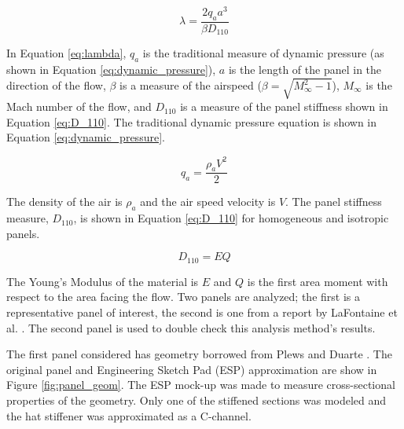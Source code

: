 \documentclass[a4paper, 12pt]{article}
\begin{document}
\begin{equation}
\lambda = \frac{2 q_a a^3}{\beta D_{110}}
\label{eq:lambda}
\end{equation}

\noindent
In Equation \ref{eq:lambda}, 
$q_a$ is the traditional measure of dynamic pressure 
(as shown in Equation \ref{eq:dynamic_pressure}),
$a$ is the length of the panel in the direction of the flow,
$\beta$ is a measure of the airspeed ($\beta = \sqrt{M_{\infty}^2 -1}$),
$M_{\infty}$ is the Mach number of the flow,
and
$D_{110}$ is a measure of the panel stiffness shown in Equation \ref{eq:D_110}.
The traditional dynamic pressure equation is shown in Equation \ref{eq:dynamic_pressure}.

\begin{equation}
q_a = \frac{\rho_a V^2}{2}
\label{eq:dynamic_pressure}
\end{equation}

\noindent
The density of the air is $\rho_a$ and the air speed velocity is $V$.
The panel stiffness measure, $D_{110}$, is shown in Equation \ref{eq:D_110} 
for homogeneous and isotropic panels.

\begin{equation}
D_{110} = E Q
\label{eq:D_110}
\end{equation}

\noindent
The Young's Modulus of the material is $E$ and $Q$ is the first area moment
with respect to the area facing the flow.
Two panels are analyzed; 
the first is a representative panel of interest,
the second is one from a report by LaFontaine et al. \cite{bib:LaFontaine}.
The second panel is used to double check this analysis method's results.  

The first panel considered has geometry borrowed 
from Plews and Duarte \cite{bib:Plews}.
The original panel and Engineering Sketch Pad (ESP) approximation are 
show in Figure \ref{fig:panel_geom}.
The ESP mock-up was made to measure cross-sectional 
properties of the geometry.
Only one of the stiffened sections was modeled and 
the hat stiffener was approximated as a C-channel.
\end{document}
